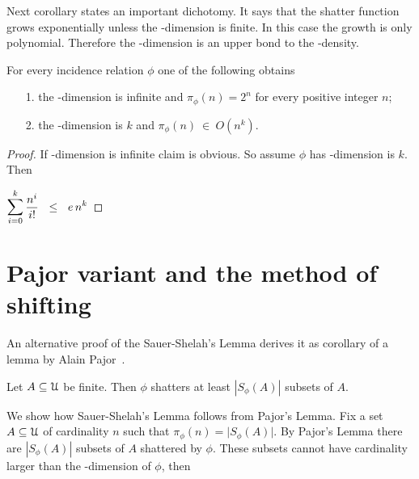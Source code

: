 \documentclass[sputnik.tex]{subfiles}
\begin{document}
Next corollary states an important dichotomy.
It says that the shatter function grows exponentially unless the \vc-dimension is finite.
In this case the growth is only polynomial.
Therefore the \vc-dimension is an upper bond to the \vc-density.

\begin{corollary}\label{coroll_Sauer}
For every incidence relation $\phi$ one of the following obtains
\begin{itemize}
 \item[1.] the \vc-dimension is infinite and $\pi_\phi(n)=2^n$ for every positive integer $n$;
 \item[2.] the \vc-dimension is $k$ and $\pi_\phi(n)\ \in\ O(n^k)$.
\end{itemize}
\end{corollary}
\begin{proof}
If \vc-dimension is infinite claim  is obvious.
So assume $\phi$ has \vc-dimension is $k$.
Then

\medrel{\le}$\displaystyle\bigsum^k_{i=0}\frac{n^i}{i!}\medrel{\le}e\,n^k$%
\end{proof}

% 

\section{Pajor variant and the method of shifting}

An alternative proof of the Sauer-Shelah's Lemma derives it as corollary of a lemma by Alain Pajor~\cite{pajor}.

\begin{proposition}\label{prop_Pajor}
Let $A\subseteq\EuScript U$ be finite.
Then $\phi$ shatters at least $|S_\phi(A)|$ subsets of $A$.
\end{proposition}

We show how Sauer-Shelah's Lemma follows from Pajor's Lemma.
Fix a set $A\subseteq\EuScript U$ of cardinality $n$ such that $\pi_\phi(n)=\big|S_\phi(A)\big|$.
By Pajor's Lemma there are $|S_\phi(A)|$ subsets of $A$ shattered by $\phi$.
These subsets cannot have cardinality larger than the \vc-dimension of $\phi$, then 
\end{document}
